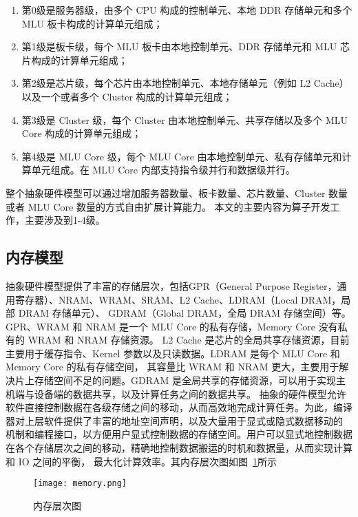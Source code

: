 \begin{enumerate}

\item 第0级是服务器级，由多个 CPU 构成的控制单元、本地 DDR 存储单元和多个 MLU 板卡构成的计算单元组成；

\item 第1级是板卡级，每个 MLU 板卡由本地控制单元、DDR 存储单元和 MLU 芯片构成的计算单元组成；

\item 第2级是芯片级，每个芯片由本地控制单元、本地存储单元（例如 L2 Cache）以及一个或者多个 Cluster 构成的计算单元组成；

\item 第3级是 Cluster 级，每个 Cluster 由本地控制单元、共享存储以及多个 MLU Core 构成的计算单元组成；

\item 第4级是 MLU Core 级，每个 MLU Core 由本地控制单元、私有存储单元和计算单元组成。在 MLU Core 内部支持指令级并行和数据级并行。
\end{enumerate}
整个抽象硬件模型可以通过增加服务器数量、板卡数量、芯片数量、Cluster 数量或者 MLU Core 数量的方式自由扩展计算能力。
本文的主要内容为算子开发工作，主要涉及到1-4级。

\subsection{内存模型}
抽象硬件模型提供了丰富的存储层次，包括GPR（General Purpose Register，通用寄存器）、NRAM、WRAM、SRAM、L2 Cache、LDRAM（Local DRAM，局部 DRAM 存储单元）、
GDRAM（Global DRAM，全局 DRAM 存储空间）等。GPR、WRAM 和 NRAM 是一个 MLU Core 的私有存储，Memory Core 没有私有的 WRAM 和 NRAM 存储资源。
L2 Cache 是芯片的全局共享存储资源，目前主要用于缓存指令、Kernel 参数以及只读数据。LDRAM 是每个 MLU Core 和 Memory Core 的私有存储空间，
其容量比 WRAM 和 NRAM 更大，主要用于解决片上存储空间不足的问题。GDRAM 是全局共享的存储资源，可以用于实现主机端与设备端的数据共享，以及计算任务之间的数据共享。
抽象的硬件模型允许软件直接控制数据在各级存储之间的移动，从而高效地完成计算任务。为此，编译器对上层软件提供了丰富的地址空间声明，以及大量用于显式或隐式数据移动的
机制和编程接口，以方便用户显式控制数据的存储空间。用户可以显式地控制数据在各个存储层次之间的移动，精确地控制数据搬运的时机和数据量，从而实现计算和 IO 之间的平衡，
最大化计算效率。其内存层次图如图~\ref{fig:memory}所示
\begin{figure}[ht]
    \centering
    \texttt{[image: memory.png]}
    \caption{内存层次图}
    \label{fig:memory}
    \note{}
  \end{figure}

